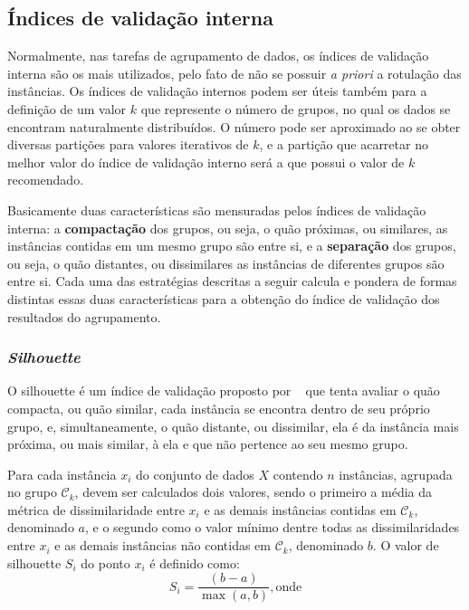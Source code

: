 \subsection{Índices de validação interna} \label{sec:indice_validacao_interna}

Normalmente, nas tarefas de agrupamento de dados, os índices de validação interna são os mais utilizados, pelo fato de não se possuir \emph{a priori} a rotulação das instâncias. Os índices de validação internos podem ser úteis também para a definição de um valor $k$ que represente o número de grupos, no qual os dados se encontram naturalmente distribuídos. O número pode ser aproximado ao se obter diversas partições para valores iterativos de $k$, e a partição que acarretar no melhor valor do índice de validação interno será a que possui o valor de $k$ recomendado.

Basicamente duas características são mensuradas pelos índices de validação interna: a \textbf{compactação} dos grupos, ou seja, o quão próximas, ou similares, as instâncias contidas em um mesmo grupo são entre si, e a \textbf{separação} dos grupos, ou seja, o quão distantes, ou dissimilares as instâncias de diferentes grupos são entre si. Cada uma das estratégias descritas a seguir calcula e pondera de formas distintas essas duas características para a obtenção do índice de validação dos resultados do agrupamento.

\subsubsection{\emph{Silhouette}}

O silhouette é um índice de validação proposto por ~\parencite{Rousseeuw:1987:SGA:38768.38772} que tenta avaliar o quão compacta, ou quão similar, cada instância se encontra dentro de seu próprio grupo, e, simultaneamente, o quão distante, ou dissimilar, ela é da instância mais próxima, ou mais similar, à ela e que não pertence ao seu mesmo grupo.

Para cada instância $x_i$ do conjunto de dados $X$ contendo $n$ instâncias, agrupada no grupo $\mathcal{C}_k$, devem ser calculados dois valores, sendo o primeiro a média da métrica de dissimilaridade entre $x_i$ e as demais instâncias contidas em $\mathcal{C}_k$, denominado $a$, e o segundo como o valor mínimo dentre todas as dissimilaridades entre $x_i$ e as demais instâncias não contidas em $\mathcal{C}_k$, denominado $b$. O valor de silhouette $S_i$ do ponto $x_i$ é definido como:
\begin{equation}
S_i = \frac{(b-a)}{\max(a,b)}, \mathrm{onde}
\end{equation}

